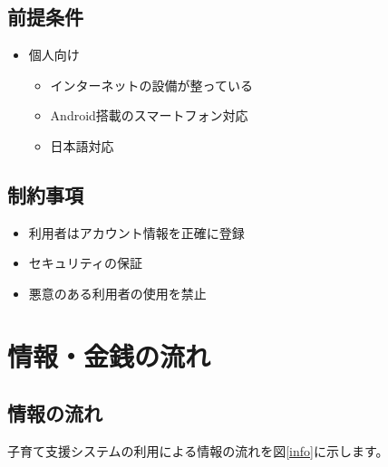 \documentclass[a4j]{jarticle}
\begin{document}
\subsection{前提条件}
\begin{itemize}
  \item 個人向け
  \begin{itemize}
    \item インターネットの設備が整っている
　   \item Android搭載のスマートフォン対応
　   \item 日本語対応
  \end{itemize}
\end{itemize}

\subsection{制約事項}

\begin{itemize}
\item 利用者はアカウント情報を正確に登録
\item セキュリティの保証
\item 悪意のある利用者の使用を禁止

\end{itemize}

\section{情報・金銭の流れ}

\subsection{情報の流れ}
子育て支援システムの利用による情報の流れを図\ref{info}に示します。		%
\end{document}
